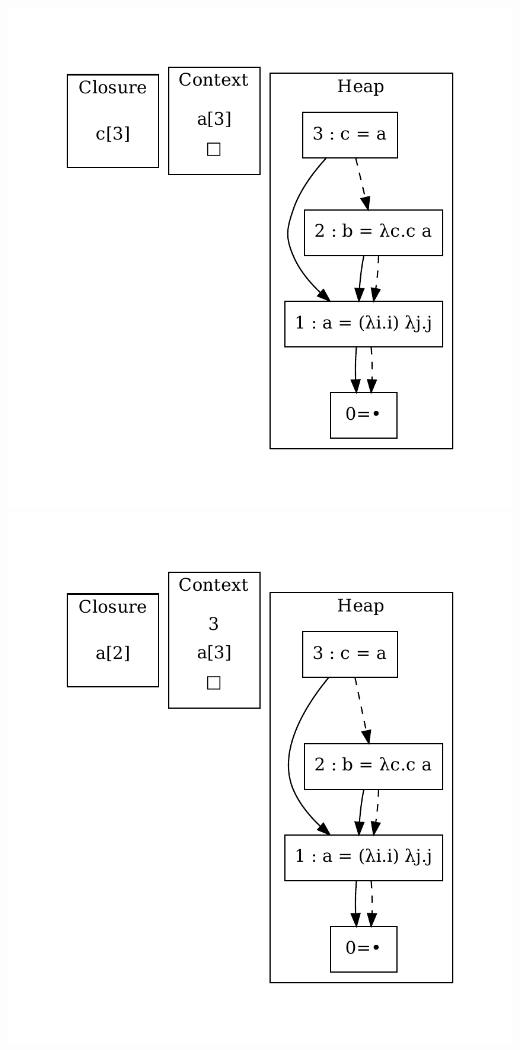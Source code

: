 \includegraphics[width=\linewidth/2]{figures/10.pdf}
\includegraphics[width=\linewidth/2]{figures/11.pdf}
